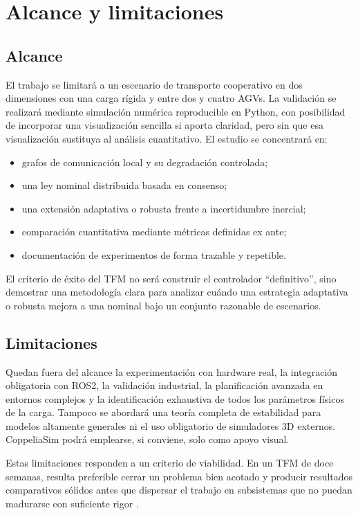 \section{Alcance y limitaciones}

\subsection{Alcance}

El trabajo se limitará a un escenario de transporte cooperativo en dos dimensiones con una carga rígida y entre dos y cuatro AGVs. La validación se realizará mediante simulación numérica reproducible en Python, con posibilidad de incorporar una visualización sencilla si aporta claridad, pero sin que esa visualización sustituya al análisis cuantitativo. El estudio se concentrará en:

\begin{itemize}
  \item grafos de comunicación local y su degradación controlada;
  \item una ley nominal distribuida basada en consenso;
  \item una extensión adaptativa o robusta frente a incertidumbre inercial;
  \item comparación cuantitativa mediante métricas definidas ex ante;
  \item documentación de experimentos de forma trazable y repetible.
\end{itemize}

El criterio de éxito del TFM no será construir el controlador ``definitivo'', sino demostrar una metodología clara para analizar cuándo una estrategia adaptativa o robusta mejora a una nominal bajo un conjunto razonable de escenarios.

\subsection{Limitaciones}

Quedan fuera del alcance la experimentación con hardware real, la integración obligatoria con ROS2, la validación industrial, la planificación avanzada en entornos complejos y la identificación exhaustiva de todos los parámetros físicos de la carga. Tampoco se abordará una teoría completa de estabilidad para modelos altamente generales ni el uso obligatorio de simuladores 3D externos. CoppeliaSim podrá emplearse, si conviene, solo como apoyo visual.

Estas limitaciones responden a un criterio de viabilidad. En un TFM de doce semanas, resulta preferible cerrar un problema bien acotado y producir resultados comparativos sólidos antes que dispersar el trabajo en subsistemas que no puedan madurarse con suficiente rigor \citep{an2023cooperative,ebel2024cooperative}.
